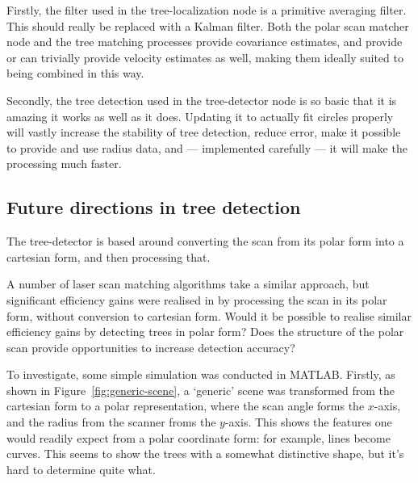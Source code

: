 \documentclass[12pt,oneside,a4paper,draft]{book}
\begin{document}
Firstly, the filter used in the tree-localization node is a primitive
averaging filter. This should really be replaced with a Kalman
filter. Both the polar scan matcher node and the tree matching
processes provide covariance estimates, and provide or can trivially
provide velocity estimates as well, making them ideally suited to
being combined in this way.

Secondly, the tree detection used in the tree-detector node is so
basic that it is amazing it works as well as it does. Updating it to
actually fit circles properly will vastly increase the stability of
tree detection, reduce error, make it possible to provide and use
radius data, and --- implemented carefully --- it will make the
processing much faster.

\subsection{Future directions in tree detection}
\label{sec:future-direct-tree}

The tree-detector is based around converting the scan from its polar
form into a cartesian form, and then processing that.

A number of laser scan matching algorithms take a similar approach,
but significant efficiency gains were realised in
\cite{polarscanmatching} by processing the scan in its polar form,
without conversion to cartesian form. Would it be possible to realise
similar efficiency gains by detecting trees in polar form? Does the
structure of the polar scan provide opportunities to increase
detection accuracy?

To investigate, some simple simulation was conducted in MATLAB. 
\newpage
Firstly, as shown in Figure~\ref{fig:generic-scene}, a `generic' scene
was transformed from the cartesian form to a polar representation,
where the scan angle forms the $x$-axis, and the radius from the
scanner froms the $y$-axis. This shows the features one would readily
expect from a polar coordinate form: for example, lines become
curves. This seems to show the trees with a somewhat distinctive
shape, but it's hard to determine quite what.
\end{document}
